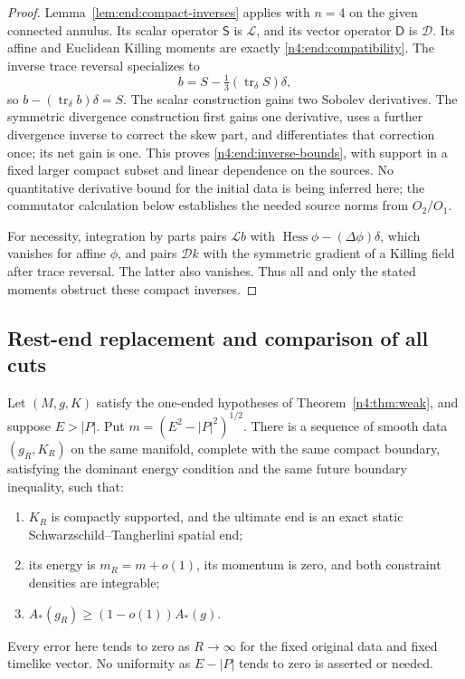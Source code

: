 \begin{proof}
Lemma~\ref{lem:end:compact-inverses} applies with $n=4$ on the given
connected annulus. Its scalar operator $\mathsf S$ is $\mathcal L$,
and its vector operator $\mathsf D$ is $\mathcal D$. Its affine and
Euclidean Killing moments are exactly \eqref{n4:end:compatibility}.
The inverse trace reversal specializes to
\begin{equation}\label{n4:end:trace-inverse}
 b=S-\tfrac13(\operatorname{tr}_\delta S)\delta,
\end{equation}
so $b-(\operatorname{tr}_\delta b)\delta=S$.
The scalar construction gains two Sobolev derivatives. The symmetric
divergence construction first gains one derivative, uses a further
divergence inverse to correct the skew part, and differentiates that
correction once; its net gain is one. This proves
\eqref{n4:end:inverse-bounds}, with support in a fixed larger compact
subset and linear dependence on the sources. No quantitative derivative
bound for the initial data is being inferred here; the commutator
calculation below establishes the needed source norms from $O_2/O_1$.

For necessity, integration by parts pairs $\mathcal Lb$ with
$\operatorname{Hess}\phi-(\Delta\phi)\delta$, which vanishes for
affine $\phi$, and pairs $\mathcal Dk$ with the symmetric gradient
of a Killing field after trace reversal. The latter also vanishes.
Thus all and only the stated moments obstruct these compact inverses.
\end{proof}

\subsection{Rest-end replacement and comparison of all cuts}

\begin{proposition}\label{n4:prop:rest-end}
Let \((M,g,K)\) satisfy the one-ended hypotheses of
Theorem~\ref{n4:thm:weak}, and suppose \(E>|P|\). Put
\(m=(E^2-|P|^2)^{1/2}\). There is a sequence of smooth data
\((g_R,K_R)\) on the same manifold, complete with the same compact
boundary, satisfying the dominant energy condition and the same future
boundary inequality, such that:
\begin{enumerate}[label=\textup{(\roman*)}]
 \item \(K_R\) is compactly supported, and the ultimate end is an exact
 static Schwarzschild--Tangherlini spatial end;
 \item its energy is \(m_R=m+o(1)\), its momentum is zero, and both
 constraint densities are integrable;
 \item \(A_*(g_R)\ge(1-o(1))A_*(g)\).
\end{enumerate}
Every error here tends to zero as \(R\to\infty\) for the fixed original
data and fixed timelike vector. No uniformity as \(E-|P|\) tends to zero
is asserted or needed.
\end{proposition}

